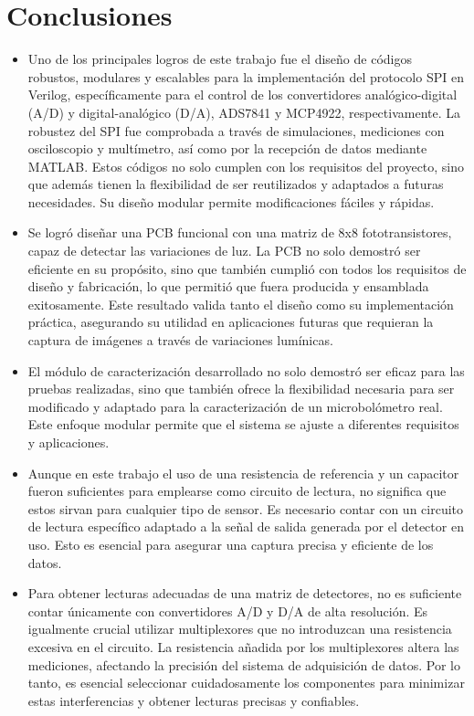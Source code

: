 \chapter{Conclusiones}

\begin{itemize}
 \item Uno de los principales logros de este trabajo fue el diseño de códigos robustos, modulares y escalables para la implementación del protocolo SPI en Verilog, específicamente para el control de los convertidores analógico-digital (A/D) y digital-analógico (D/A), ADS7841 y MCP4922, respectivamente. La robustez del SPI fue comprobada a través de simulaciones, mediciones con osciloscopio y multímetro, así como por la recepción de datos mediante MATLAB. Estos códigos no solo cumplen con los requisitos del proyecto, sino que además tienen la flexibilidad de ser reutilizados y adaptados a futuras necesidades. Su diseño modular permite modificaciones fáciles y rápidas.
 \item Se logró diseñar una PCB funcional con una matriz de 8x8 fototransistores, capaz de detectar las variaciones de luz. La PCB no solo demostró ser eficiente en su propósito, sino que también cumplió con todos los requisitos de diseño y fabricación, lo que permitió que fuera producida y ensamblada exitosamente. Este resultado valida tanto el diseño como su implementación práctica, asegurando su utilidad en aplicaciones futuras que requieran la captura de imágenes a través de variaciones lumínicas.  
 \item El módulo de caracterización desarrollado no solo demostró ser eficaz para las pruebas realizadas, sino que también ofrece la flexibilidad necesaria para ser modificado y adaptado para la caracterización de un microbolómetro real. Este enfoque modular permite que el sistema se ajuste a diferentes requisitos y aplicaciones.
 \item Aunque en este trabajo el uso de una resistencia de referencia y un capacitor fueron suficientes para emplearse como circuito de lectura, no significa que estos sirvan para cualquier tipo de sensor. Es necesario contar con un circuito de lectura específico adaptado a la señal de salida generada por el detector en uso. Esto es esencial para asegurar una captura precisa y eficiente de los datos.
 \item Para obtener lecturas adecuadas de una matriz de detectores, no es suficiente contar únicamente con convertidores A/D y D/A de alta resolución. Es igualmente crucial utilizar multiplexores que no introduzcan una resistencia excesiva en el circuito. La resistencia añadida por los multiplexores altera las mediciones, afectando la precisión del sistema de adquisición de datos. Por lo tanto, es esencial seleccionar cuidadosamente los componentes para minimizar estas interferencias y obtener lecturas precisas y confiables.
\end{itemize}


    
